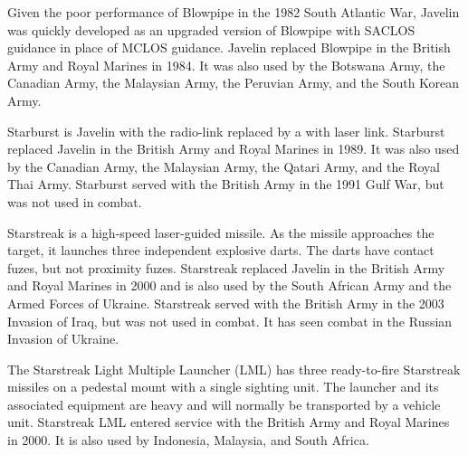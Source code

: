 
Given the poor performance of Blowpipe in the 1982 South Atlantic War, Javelin was quickly developed as an upgraded version of Blowpipe with SACLOS guidance in place of MCLOS guidance.
Javelin replaced Blowpipe in the British Army and Royal Marines in 1984.
It was also used by the Botswana Army, the Canadian Army, the Malaysian Army, the Peruvian Army, and the South Korean Army.%


Starburst is Javelin with the radio-link replaced by a with laser link.
Starburst replaced Javelin in the British Army and Royal Marines in 1989.
It was also used by the Canadian Army, the Malaysian Army, the Qatari Army, and the Royal Thai Army.
Starburst served with the British Army in the 1991 Gulf War, but was not used in combat.%


Starstreak is a high-speed laser-guided missile. As the missile approaches the target, it launches three independent explosive darts. The darts have contact fuzes, but not proximity fuzes.
Starstreak replaced Javelin in the British Army and Royal Marines in 2000 and is also used by the South African Army and the Armed Forces of Ukraine.
Starstreak served with the British Army in the 2003 Invasion of Iraq, but was not used in combat. It has seen combat in the Russian Invasion of Ukraine.%


The Starstreak Light Multiple Launcher (LML) has three ready-to-fire Starstreak missiles on a pedestal mount with a single sighting unit. The launcher and its associated equipment are heavy and will normally be transported by a vehicle unit.
Starstreak LML entered service with the British Army and Royal Marines in 2000.
It is also used by Indonesia, Malaysia, and South Africa.%

